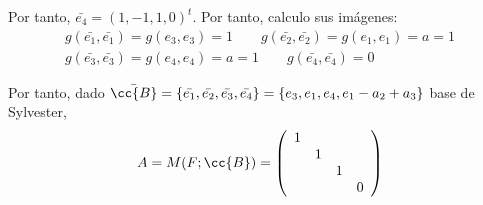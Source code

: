\begin{ejercicio}
\begin{enumerate}
        Por tanto, $\bar{e_4} = (1, -1, 1, 0)^t$. Por tanto, calculo sus imágenes:
        \begin{gather*}
            g(\bar{e_1},\bar{e_1}) = g(e_3,e_3) = 1 \qquad
            g(\bar{e_2},\bar{e_2}) = g(e_1,e_1) = a = 1 \\
            g(\bar{e_3},\bar{e_3}) = g(e_4,e_4) = a = 1 \qquad
            g(\bar{e_4},\bar{e_4}) = 0
        \end{gather*}

        Por tanto, dado $\bar{\cc{B}}=\{\bar{e_1},\bar{e_2},\bar{e_3},\bar{e_4}\} = \{e_3,e_1,e_4,e_1-a_2+a_3\}$ base de Sylvester,
        \begin{equation*}
            A=M(F;\cc{B}) = \left( \begin{array}{cccc}
                1 & \\
                 & 1 \\
                 & & 1 \\
                 &  & & 0
            \end{array} \right)
        \end{equation*}
    \end{enumerate}
\end{ejercicio}

